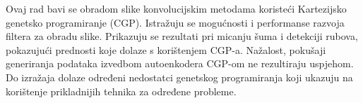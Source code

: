 Ovaj rad bavi se obradom slike konvolucijskim metodama koristeći Kartezijsko genetsko programiranje (CGP).
Istražuju se mogućnosti i performanse razvoja filtera za obradu slike.
Prikazuju se rezultati pri micanju šuma i detekciji rubova, pokazujući prednosti koje dolaze s korištenjem CGP-a.
Nažalost, pokušaji generiranja podataka izvedbom autoenkodera CGP-om ne rezultiraju uspjehom.
Do izražaja dolaze određeni nedostatci genetskog programiranja koji ukazuju na korištenje prikladnijih tehnika za određene probleme.

